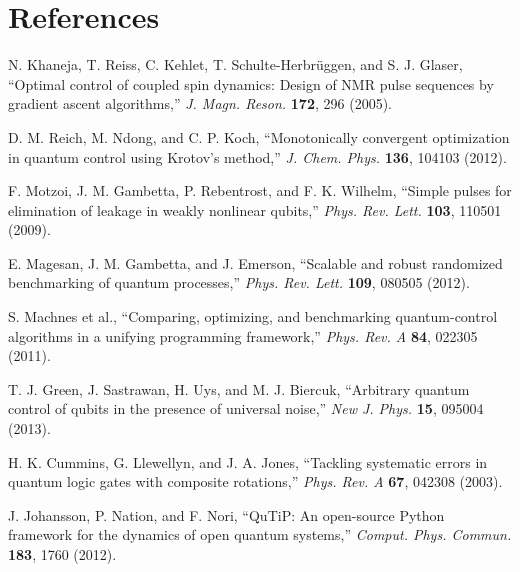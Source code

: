 \documentclass[11pt,a4paper]{article}
\theoremstyle{definition}
\theoremstyle{remark}
\begin{document}
\section*{References}

\begin{enumerate}[label={[\arabic*]}]
    \item N. Khaneja, T. Reiss, C. Kehlet, T. Schulte-Herbrüggen, and S. J. Glaser, ``Optimal control of coupled spin dynamics: Design of NMR pulse sequences by gradient ascent algorithms,'' \emph{J. Magn. Reson.} \textbf{172}, 296 (2005).

    \item D. M. Reich, M. Ndong, and C. P. Koch, ``Monotonically convergent optimization in quantum control using Krotov's method,'' \emph{J. Chem. Phys.} \textbf{136}, 104103 (2012).

    \item F. Motzoi, J. M. Gambetta, P. Rebentrost, and F. K. Wilhelm, ``Simple pulses for elimination of leakage in weakly nonlinear qubits,'' \emph{Phys. Rev. Lett.} \textbf{103}, 110501 (2009).

    \item E. Magesan, J. M. Gambetta, and J. Emerson, ``Scalable and robust randomized benchmarking of quantum processes,'' \emph{Phys. Rev. Lett.} \textbf{109}, 080505 (2012).

    \item S. Machnes et al., ``Comparing, optimizing, and benchmarking quantum-control algorithms in a unifying programming framework,'' \emph{Phys. Rev. A} \textbf{84}, 022305 (2011).

    \item T. J. Green, J. Sastrawan, H. Uys, and M. J. Biercuk, ``Arbitrary quantum control of qubits in the presence of universal noise,'' \emph{New J. Phys.} \textbf{15}, 095004 (2013).

    \item H. K. Cummins, G. Llewellyn, and J. A. Jones, ``Tackling systematic errors in quantum logic gates with composite rotations,'' \emph{Phys. Rev. A} \textbf{67}, 042308 (2003).

    \item J. Johansson, P. Nation, and F. Nori, ``QuTiP: An open-source Python framework for the dynamics of open quantum systems,'' \emph{Comput. Phys. Commun.} \textbf{183}, 1760 (2012).


\end{enumerate}
\end{document}
